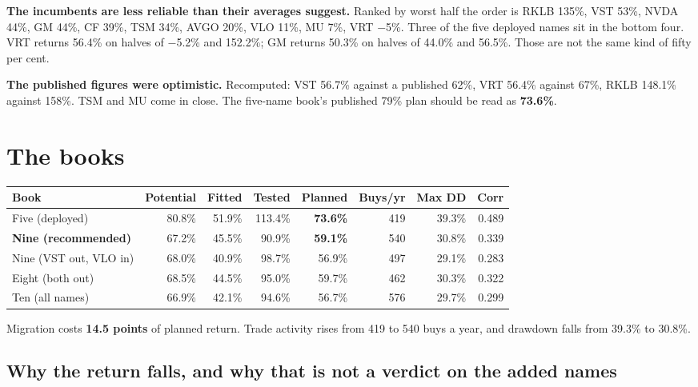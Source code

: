\documentclass[11pt]{article}
\begin{document}
\textbf{The incumbents are less reliable than their averages suggest.} Ranked by worst half the
order is RKLB 135\%, VST 53\%, NVDA 44\%, GM 44\%, CF 39\%, TSM 34\%, AVGO 20\%, VLO 11\%,
MU 7\%, VRT $-$5\%. Three of the five deployed names sit in the bottom four. VRT returns 56.4\%
on halves of $-$5.2\% and 152.2\%; GM returns 50.3\% on halves of 44.0\% and 56.5\%. Those are
not the same kind of fifty per cent.

\textbf{The published figures were optimistic.} Recomputed: VST 56.7\% against a published
62\%, VRT 56.4\% against 67\%, RKLB 148.1\% against 158\%. TSM and MU come in close. The
five-name book's published 79\% plan should be read as \textbf{73.6\%}.

\section{The books}

\begin{table}[H]\centering\small
\begin{tabular}{lrrrrrrr}
\toprule
\textbf{Book} & \textbf{Potential} & \textbf{Fitted} & \textbf{Tested} & \textbf{Planned} &
\textbf{Buys/yr} & \textbf{Max DD} & \textbf{Corr} \\
\midrule
Five (deployed)      & 80.8\% & 51.9\% & 113.4\% & \textbf{73.6\%} & 419 & 39.3\% & 0.489 \\
\rowcolor{bccream}
\textbf{Nine (recommended)} & 67.2\% & 45.5\% & 90.9\% & \textbf{59.1\%} & 540 & 30.8\% & 0.339 \\
Nine (VST out, VLO in) & 68.0\% & 40.9\% & 98.7\% & 56.9\% & 497 & 29.1\% & 0.283 \\
Eight (both out)     & 68.5\% & 44.5\% &  95.0\% & 59.7\% & 462 & 30.3\% & 0.322 \\
Ten (all names)      & 66.9\% & 42.1\% &  94.6\% & 56.7\% & 576 & 29.7\% & 0.299 \\
\bottomrule
\end{tabular}
\end{table}

Migration costs \textbf{14.5 points} of planned return. Trade activity rises from 419 to 540
buys a year, and drawdown falls from 39.3\% to 30.8\%.

\subsection{Why the return falls, and why that is not a verdict on the added names}
\end{document}
